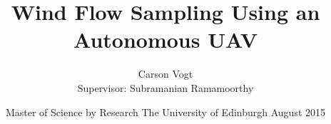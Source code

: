 \documentclass[12pt]{report}
\begin{document}
\title{Wind Flow Sampling \linebreak Using an Autonomous UAV \vspace{2.5cm}}	%
\author{
\Large Carson Vogt \vspace{1cm} \\ 
Supervisor: Subramanian Ramamoorthy \vspace{3cm}
}

\date{
	\centering
	Master of Science by Research \endgraf\medskip
	The University of Edinburgh \endgraf{} August 2015
}

\end{document}
